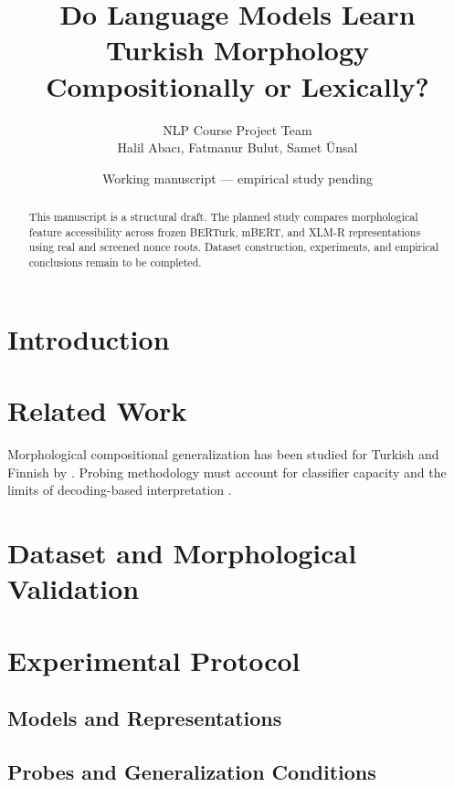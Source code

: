 \documentclass[11pt]{article}
\title{Do Language Models Learn Turkish Morphology\\Compositionally or Lexically?}
\author{NLP Course Project Team\\
Halil Abac\i{}, Fatmanur Bulut, Samet \"{U}nsal}
\date{Working manuscript --- empirical study pending}
\begin{document}
\maketitle

\begin{abstract}
This manuscript is a structural draft. The planned study compares morphological
feature accessibility across frozen BERTurk, mBERT, and XLM-R representations
using real and screened nonce roots. Dataset construction, experiments, and
empirical conclusions remain to be completed.
\end{abstract}

\section{Introduction}

\section{Related Work}
Morphological compositional generalization has been studied for Turkish and
Finnish by \citet{ismayilzada2025morphology}. Probing methodology must account
for classifier capacity and the limits of decoding-based interpretation
\citep{hewitt2019control,pimentel2020probing}.

\section{Dataset and Morphological Validation}

\section{Experimental Protocol}
\subsection{Models and Representations}
\subsection{Probes and Generalization Conditions}
\end{document}
